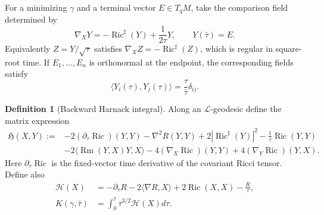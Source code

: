 \documentclass[10pt]{coll-l}
\theoremstyle{definition}
\newtheorem{definition}[theorem]{Definition}
\theoremstyle{remark}
\numberwithin{section}{chapter}
\numberwithin{equation}{chapter}
\newcommand{\Ric}{\operatorname{Ric}}
\newcommand{\Rm}{\operatorname{Rm}}
\begin{document}
For a minimizing $\gamma$ and a terminal vector $E\in T_qM$, take the
comparison field determined by
\begin{equation}
 \nabla_XY=-\Ric^\sharp(Y)+\frac{1}{2\tau}Y,
 \qquad Y(\bar\tau)=E.                                 \label{eq:red-comparison-field}
\end{equation}
Equivalently $Z=Y/\sqrt\tau$ satisfies
$\nabla_XZ=-\Ric^\sharp(Z)$, which is regular in square-root time.  If
$E_1,\ldots,E_n$ is orthonormal at the endpoint, the corresponding fields
satisfy
\begin{equation}
                 \langle Y_i(\tau),Y_j(\tau)\rangle
                 =\frac\tau{\bar\tau}\delta_{ij}.       \label{eq:red-comparison-orthogonality}
\end{equation}

\begin{definition}[Backward Harnack integral]
\label{def:red-Harnack-integral}
Along an $\mathcal L$-geodesic define the matrix expression
\begin{align}
 \mathfrak H(X,Y):={}&-2(\partial_\tau\Ric)(Y,Y)
       -\nabla^2R(Y,Y)+2|\Ric^\sharp(Y)|^2
       -\frac1\tau\Ric(Y,Y)                            \label{eq:red-matrix-Harnack-integrand}\\
 &-2\langle\Rm(Y,X)Y,X\rangle
       -4(\nabla_X\Ric)(Y,Y)+4(\nabla_Y\Ric)(Y,X).\nonumber
\end{align}
Here $\partial_\tau\Ric$ is the fixed-vector time derivative of the
covariant Ricci tensor.  Define also
\begin{align}
 \mathcal H(X)&=-\partial_\tau R-2\langle\nabla R,X\rangle
       +2\Ric(X,X)-\frac R\tau,                         \label{eq:red-Harnack-integrand}\\
 K(\gamma,\bar\tau)&=
       \int_0^{\bar\tau}\tau^{3/2}\mathcal H(X)d\tau. \label{eq:red-K-definition}
\end{align}
\end{definition}
\end{document}
